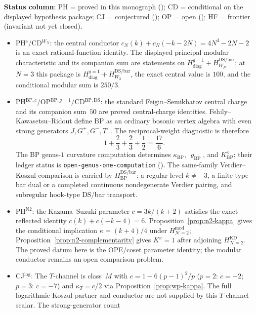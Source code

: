 \noindent\textbf{Status column}: PH = proved in this monograph
(\ClaimStatusProvedHere); CD = conditional on the displayed hypothesis
package; CJ = conjectured (\ClaimStatusConjectured);
OP = open (\ClaimStatusOpen); HF = frontier (invariant not yet closed).
\begin{itemize}[leftmargin=*]
 \item PH$^c$/CD$^{W_N}$: the central conductor
 $c_N(k)+c_N(-k-2N)=4N^3-2N-2$ is an exact rational-function
 identity.  The displayed principal modular characteristic and its
 companion sum are statements on
 $H_{\mathrm{diag}}^{g=1}+H_{W_N}^{\mathrm{DS/bar}}$; at $N=3$ this
 package is $H_{\mathrm{diag}}^{g=1}+H_{W_3}^{\mathrm{DS/bar}}$, the
 exact central value is $100$, and the conditional modular sum is
 $250/3$.
 \item PH$^{\mathrm{BP},c}$/OP$^{\mathrm{BP},g=1}$/CD$^{\mathrm{BP,DS}}$:
 the standard Feigin--Semikhatov central charge and its companion
 sum~$50$ are proved central-charge identities.  Fehily--Kawasetsu--Ridout
 define BP as an ordinary bosonic vertex algebra with even strong
 generators $J,G^+,G^-,T$~\cite[\S2.1]{FKR20}.  The reciprocal-weight
 diagnostic is therefore
 \[
  1+\frac23+\frac23+\frac12=\frac{17}{6}.
 \]
 The BP genus-$1$ curvature computation determines
 $\kappa_{\mathrm{BP}}$, $\varrho_{\mathrm{BP}}$, and
 $K^\kappa_{\mathrm{BP}}$; their ledger status is
 \texttt{open-genus-one-computation} (\ClaimStatusOpen).  The same-family
 Verdier--Koszul comparison is carried by
 $H_{\mathrm{BP}}^{\mathrm{DS/bar}}$: a regular level $k\ne-3$,
 a finite-type bar dual or a completed continuous nondegenerate
 Verdier pairing, and subregular hook-type DS/bar transport.
 \item PH$^{\mathrm{N2}}$: the Kazama--Suzuki parameter
 $c = 3k/(k{+}2)$ satisfies the exact reflected identity
 $c(k)+c(-k-4)=6$.  Proposition~\ref{prop:n2-kappa} gives the
 conditional implication
 $\kappa=(k+4)/4$ under
 $H_{\mathcal N=2}^{\mathrm{mod}}$; Proposition~\ref{prop:n2-complementarity}
 gives $K^\kappa=1$ after adjoining
 $H_{\mathcal N=2}^{\mathrm{KD}}$.  The proved datum here is the
 OPE/coset parameter identity; the modular conductor remains an open
 comparison problem.
 \item CJ$^{\mathrm{log}}$: The $T$-channel is class~$M$ with
 $c = 1 - 6(p-1)^2/p$ \textup{(}$p = 2$: $c = -2$;
 $p = 3$: $c = -7$\textup{)} and $\kappa_T = c/2$ via
 Proposition~\ref{prop:wp-kappa}. The full logarithmic Koszul partner
 and conductor are not supplied by this $T$-channel scalar. The
 strong-generator count

\end{itemize}
